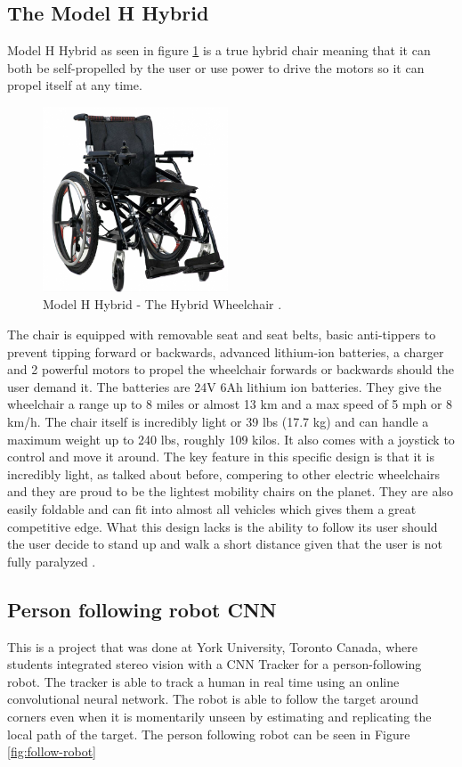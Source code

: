 \subsection{The Model H Hybrid}
Model H Hybrid as seen in figure \ref{fig:ModlHHybrid} is a true hybrid chair meaning that it can both be self-propelled by the user or use power to drive the motors so it can propel itself at any time.

\begin{figure}[!ht]
    \centering
    \includegraphics[height=55mm]{graphics/Hybrid_stÃ³ll.png}
    \caption{Model H Hybrid - The Hybrid Wheelchair \cite{jdy_imports_model_2022}.}
    \label{fig:ModlHHybrid}
\end{figure}

The chair is equipped with removable seat and seat belts, basic anti-tippers to prevent tipping forward or backwards, advanced lithium-ion batteries, a charger and 2 powerful motors to propel the wheelchair forwards or backwards should the user demand it. 
The batteries are 24V 6Ah lithium ion batteries. They give the wheelchair a range up to 8 miles or almost 13 km and a max speed of 5 mph or 8 km/h.
The chair itself is incredibly light or 39 lbs (17.7 kg) and can handle a maximum weight up to 240 lbs, roughly 109 kilos. 
It also comes with a joystick to control and move it around. The key feature in this specific design is that it is incredibly light, as talked about before, compering to other electric wheelchairs and they are proud to be the lightest mobility chairs on the planet.
They are also easily foldable and can fit into almost all vehicles which gives them a great competitive edge.
What this design lacks is the ability to follow its user should the user decide to stand up and walk a short distance given that the user is not fully paralyzed \cite{jdy_imports_model_2022}.


\subsection{Person following robot CNN}
This is a project that was done at York University, Toronto Canada, where students integrated stereo vision with a CNN Tracker for a person-following robot. The tracker is able to track a human in real time using an online convolutional neural network. The robot is able to follow the target around corners even when it is momentarily unseen by estimating and replicating the local path of the target.
The person following robot can be seen in Figure \ref{fig:follow-robot}

